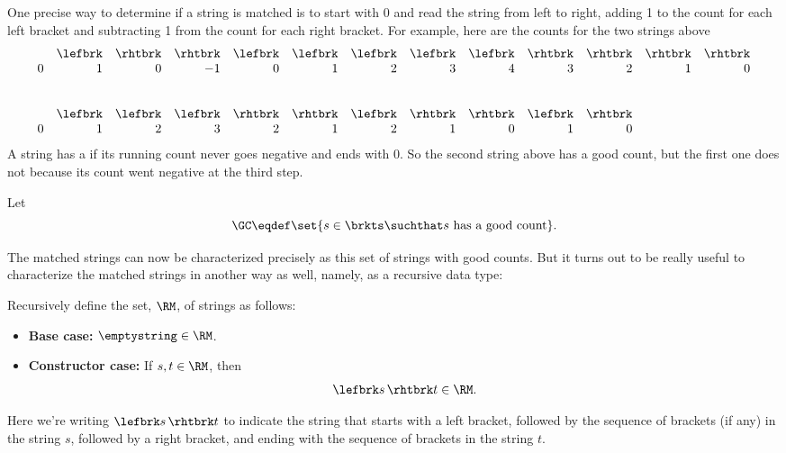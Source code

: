 One precise way to determine if a string is matched is to start with 0 and
read the string from left to right, adding 1 to the count for each left
bracket and subtracting 1 from the count for each right bracket.
For example, here are the counts for the two strings above
\[\begin{array}{rrrrrrrrrrrrr}
& \lefbrk & \rhtbrk & \rhtbrk & \lefbrk & \lefbrk & \lefbrk & \lefbrk &
\lefbrk & \rhtbrk & \rhtbrk & \rhtbrk & \rhtbrk\\
0 & 1 & 0 & -1 & 0 & 1 & 2 & 3 & 4 & 3 & 2 & 1 & 0\\
\\
\\
& \lefbrk & \lefbrk & \lefbrk & \rhtbrk & \rhtbrk & \lefbrk & \rhtbrk &
\rhtbrk & \lefbrk & \rhtbrk\\
0 & 1 & 2 & 3 & 2 & 1 & 2 & 1 & 0 & 1 & 0
\end{array}\]
A string has a  if its running count never goes
negative and ends with 0.  So the second string above has a good count, but
the first one does not because its count went negative at the third step.
\begin{definition}\label{gc-def}
Let
\[
\GC \eqdef \set{ s \in \brkts \suchthat s\ \text{has a good count}}.
\]
\end{definition}
The matched strings can now be characterized precisely as this set of
strings with good counts.  But it turns out to be really useful to
characterize the matched strings in another way as well, namely, as a
recursive data type:

\begin{definition}\label{RM-def}
Recursively define the set, $\RM$, of strings as follows:
\begin{itemize}

\item \textbf{Base case:} $\emptystring \in\RM$.

\item \textbf{Constructor case:} If $s,t \in\RM$, then
\[
\lefbrk s\, \rhtbrk t \in\RM.
\]

\end{itemize}

\end{definition}

Here we're writing $\lefbrk s\, \rhtbrk t$ to indicate the string that
starts with a left bracket, followed by the sequence of brackets
(if any) in the string $s$, followed by a right bracket, and ending
with the sequence of brackets in the string $t$.

